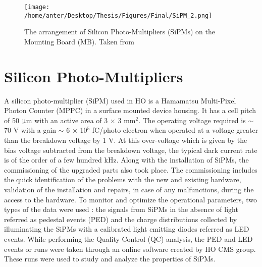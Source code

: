 \begin{figure}[!h]
\begin{center}
\vspace*{-0mm}
\hspace*{-5mm}
\texttt{[image: /home/anter/Desktop/Thesis/Figures/Final/SiPM\_2.png]}\\
\vspace*{4mm}
\caption[The arrangement of Silicon Photo-Multipliers (SiPMs) on the Mounting Board (MB).]{The arrangement of Silicon Photo-Multipliers (SiPMs) on the Mounting Board (MB). Taken from \cite{DN}}
\label{fig:sipm}
\end{center}
\end{figure} 

\section{Silicon Photo-Multipliers}
A silicon photo-multiplier (SiPM) used in HO is a Hamamatsu Multi-Pixel Photon Counter (MPPC) in a surface mounted device housing. It has a cell pitch of 50 $\micro$m with an active area of 3 $\times$ 3 mm$^2$. The operating voltage required is $\sim$ 70 V with a gain $\sim$ 6 $\times$ 10$^5$ fC/photo-electron when operated at a voltage greater than the breakdown voltage by 1 V. At this over-voltage which is given by the bias voltage subtracted from the breakdown voltage, the typical dark current rate is of the order of a few hundred kHz. Along with the installation of SiPMs, the commissioning of the upgraded parts also took place. The commissioning includes the quick identification of the problems with the new and existing hardware, validation of the installation and repairs, in case of any malfunctions, during the access to the hardware. To monitor and optimize the operational parameters, two types of the data were used : the signals from SiPMs in the absence of light referred as pedestal events (PED) and the charge distributions collected by illuminating the SiPMs with a calibrated light emitting diodes referred as LED events. While performing the Quality Control (QC) analysis, the PED and LED events or runs were taken through an online software created by HO CMS group. These runs were used to study and analyze the properties of SiPMs. 

